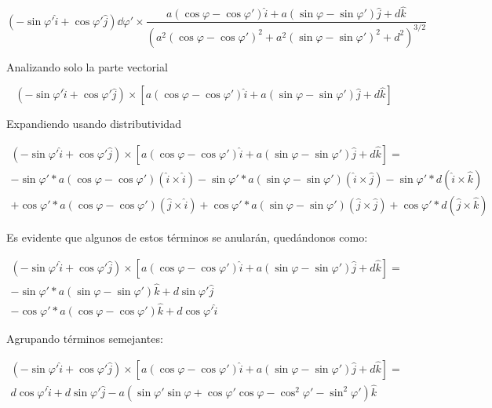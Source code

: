 \documentclass[11pt]{report}
\theoremstyle{plain}
\theoremstyle{definition}
\begin{document}
	\begin{equation*}%
		\left(-\sin\varphi'\hat{i} + \cos\varphi'\hat{j}\right)\dd{\varphi'} \times \frac{a(\cos\varphi-\cos\varphi')\hat{i} + a(\sin\varphi-\sin\varphi')\hat{j} + d\hat{k}}{\left(a^2(\cos\varphi-\cos\varphi')^2 + a^2(\sin\varphi-\sin\varphi')^2 + d^2\right)^{3/2}}
	\end{equation*}
	
	Analizando solo la parte vectorial
	
	\begin{equation*}
		\left(-\sin\varphi'\hat{i} + \cos\varphi'\hat{j}\right) \times \left[a(\cos\varphi-\cos\varphi')\hat{i} + a(\sin\varphi-\sin\varphi')\hat{j} + d\hat{k} \right]
	\end{equation*}
	
	Expandiendo usando distributividad
	
	\begin{align*}%
		\left(-\sin\varphi'\hat{i} + \cos\varphi'\hat{j}\right) \times \left[a(\cos\varphi-\cos\varphi')\hat{i} + a(\sin\varphi-\sin\varphi')\hat{j} + d\hat{k} \right] =\\
		-\sin\varphi'*a(\cos\varphi-\cos\varphi')\left(\hat{i}\times\hat{i}\right) -\sin\varphi'*a(\sin\varphi-\sin\varphi') \left(\hat{i}\times\hat{j}\right) -\sin\varphi'*d \left(\hat{i}\times\hat{k}\right) \\
		+\cos\varphi'*a(\cos\varphi-\cos\varphi') \left(\hat{j}\times\hat{i}\right) + \cos\varphi'*a(\sin\varphi-\sin\varphi') \left(\hat{j}\times\hat{j}\right) + \cos\varphi'*d\left(\hat{j}\times\hat{k}\right)
	\end{align*}
	
	Es evidente que algunos de estos términos se anularán, quedándonos como:
	
	\begin{align*}%
		\left(-\sin\varphi'\hat{i} + \cos\varphi'\hat{j}\right) \times \left[a(\cos\varphi-\cos\varphi')\hat{i} + a(\sin\varphi-\sin\varphi')\hat{j} + d\hat{k} \right] =\\
		-\sin\varphi'*a(\sin\varphi-\sin\varphi')\hat{k} + d\sin\varphi'\hat{j} \\
		-\cos\varphi'*a(\cos\varphi-\cos\varphi')\hat{k} + d\cos\varphi'\hat{i}
	\end{align*}
	
	Agrupando términos semejantes:
	
	\begin{align*} %
		\left(-\sin\varphi'\hat{i} + \cos\varphi'\hat{j}\right) \times \left[a(\cos\varphi-\cos\varphi')\hat{i} + a(\sin\varphi-\sin\varphi')\hat{j} + d\hat{k} \right] =\\
		d\cos\varphi'\hat{i}+d\sin\varphi'\hat{j}-a\left(\sin\varphi'\sin\varphi+\cos\varphi'\cos\varphi-\cos^2\varphi'-\sin^2\varphi'\right)\hat{k}
	\end{align*}
	
\end{document}
